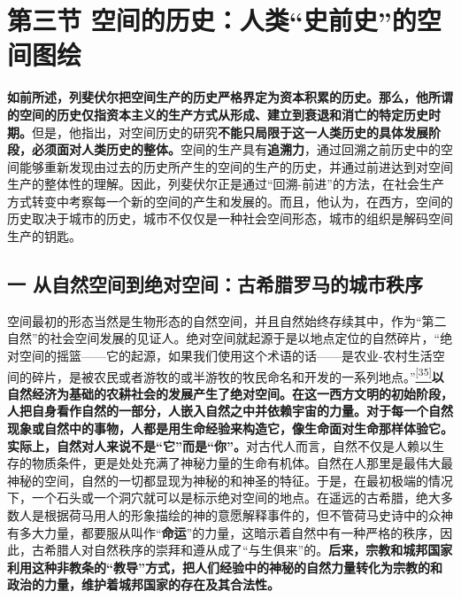\documentclass[UTF8, fontset = sourcesans, a4paper, oneside, zihao =
-4, scheme=chinese, no-math, space=true]{ctexbook}
\begin{document}
\protect\hypertarget{part0006_split_003.html}{}{}

\hypertarget{part0006_split_003.htmlux5cux23b006}{\section{\texorpdfstring{第三节
空间的历史：人类``史前史''的空间图绘}{第三节 空间的历史：人类史前史的空间图绘}}\label{part0006_split_003.htmlux5cux23b006}}

\textbf{如前所述，列斐伏尔把空间生产的历史严格界定为资本积累的历史。那么，他所谓的空间的历史仅指资本主义的生产方式从形成、建立到衰退和消亡的特定历史时期。}但是，他指出，对空间历史的研究\textbf{不能只局限于这一人类历史的具体发展阶段，必须面对人类历史的整体。}空间的生产具有\textbf{追溯力}，通过回溯之前历史中的空间能够重新发现由过去的历史所产生的空间的生产的历史，并通过前进达到对空间生产的整体性的理解。因此，列斐伏尔正是通过``回溯-前进''的方法，在社会生产方式转变中考察每一个新的空间的产生和发展的。而且，他认为，在西方，空间的历史取决于城市的历史，城市不仅仅是一种社会空间形态，城市的组织是解码空间生产的钥匙。

\subsection{一
从自然空间到绝对空间：古希腊罗马的城市秩序}\label{part0006_split_003.htmlux5cux23c021}

空间最初的形态当然是生物形态的自然空间，并且自然始终存续其中，作为``第二自然''的社会空间发展的见证人。绝对空间就起源于是以地点定位的自然碎片，``绝对空间的摇篮------它的起源，如果我们使用这个术语的话------是农业-农村生活空间的碎片，是被农民或者游牧的或半游牧的牧民命名和开发的一系列地点。''\protect\hypertarget{part0006_split_003.htmlux5cux23w35}{}{}\protect\hyperlink{part0006_split_003.htmlux5cux23m35}{\textsuperscript{{[}35{]}}}\textbf{以自然经济为基础的农耕社会的发展产生了绝对空间。在这一西方文明的初始阶段，人把自身看作自然的一部分，人嵌入自然之中并依赖宇宙的力量。对于每一个自然现象或自然中的事物，人都是用生命经验来构造它，像生命面对生命那样体验它。实际上，自然对人来说不是``它''而是``你''。}对古代人而言，自然不仅是人赖以生存的物质条件，更是处处充满了神秘力量的生命有机体。自然在人那里是最伟大最神秘的空间，自然的一切都显现为神秘的和神圣的特征。于是，在最初极端的情况下，一个石头或一个洞穴就可以是标示绝对空间的地点。在遥远的古希腊，绝大多数人是根据荷马用人的形象描绘的神的意愿解释事件的，但不管荷马史诗中的众神有多大力量，都要服从叫作``\textbf{命运}''的力量，这暗示着自然中有一种严格的秩序，因此，古希腊人对自然秩序的崇拜和遵从成了``与生俱来''的。\textbf{后来，宗教和城邦国家利用这种非教条的``教导''方式，把人们经验中的神秘的自然力量转化为宗教的和政治的力量，维护着城邦国家的存在及其合法性。}
\end{document}
